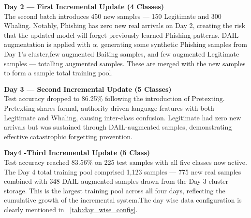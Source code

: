 \textbf{Day 2 — First Incremental Update (4 Classes)}\\
The second batch introduces 450 new samples — 150 Legitimate and 300 Whaling. Notably, Phishing has zero new real arrivals on Day 2, creating the risk that the updated model will forget previously learned Phishing patterns. DAIL augmentation is applied with $\alpha$, generating some synthetic Phishing samples from Day 1's cluster,few augmented Baiting samples, and few augmented Legitimate samples — totalling augmented samples. These are merged with the new samples to form a sample total training pool.

\textbf{Day 3 — Second Incremental Update (5 Classes)}\\
Test accuracy dropped to 86.25\% following the introduction of Pretexting. Pretexting shares formal, authority-driven language features with both Legitimate and Whaling, causing inter-class confusion. Legitimate had zero new arrivals but was sustained through DAIL-augmented samples, demonstrating effective catastrophic forgetting prevention.

\textbf{Day4 -Third Incremental Update (5 Class)}\\
Test accuracy reached 83.56\% on 225 test samples with all five classes now active. The Day 4 total training pool comprised 1,123 samples — 775 new real samples combined with 348 DAIL-augmented samples drawn from the Day 3 cluster storage. This is the largest training pool across all four days, reflecting the cumulative growth of the incremental system.The day wise data configuration is clearly mentioned in ~\ref{tab:day_wise_config}.

\begin{table}[h]
\centering
\caption{Day wise data configuration}
\label{tab:day_wise_config}
\end{table}

